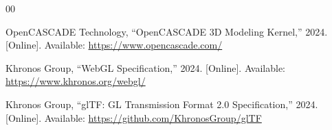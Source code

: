 \documentclass[conference]{IEEEtran}
\begin{document}
\begin{thebibliography}{00}

 OpenCASCADE Technology, ``OpenCASCADE 3D Modeling Kernel,'' 2024. [Online]. Available: \url{https://www.opencascade.com/}

 Khronos Group, ``WebGL Specification,'' 2024. [Online]. Available: \url{https://www.khronos.org/webgl/}

 Khronos Group, ``glTF: GL Transmission Format 2.0 Specification,'' 2024. [Online]. Available: \url{https://github.com/KhronosGroup/glTF}

\end{thebibliography}
\end{document}
